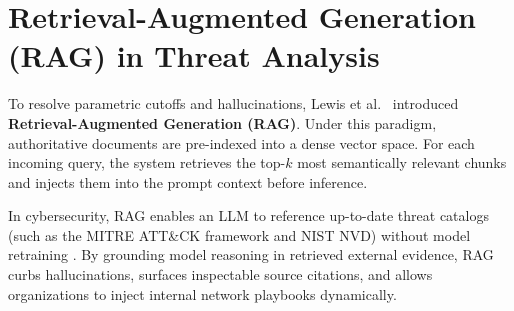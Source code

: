 \section{Retrieval-Augmented Generation (RAG) in Threat Analysis}
\label{sec:lit_rag}
To resolve parametric cutoffs and hallucinations, Lewis et al.\ \cite{lewis2020rag} introduced \textbf{Retrieval-Augmented Generation (RAG)}. Under this paradigm, authoritative documents are pre-indexed into a dense vector space. For each incoming query, the system retrieves the top-$k$ most semantically relevant chunks and injects them into the prompt context before inference.

In cybersecurity, RAG enables an LLM to reference up-to-date threat catalogs (such as the MITRE ATT\&CK framework and NIST NVD) without model retraining \cite{tarek2024cve}. By grounding model reasoning in retrieved external evidence, RAG curbs hallucinations, surfaces inspectable source citations, and allows organizations to inject internal network playbooks dynamically.

